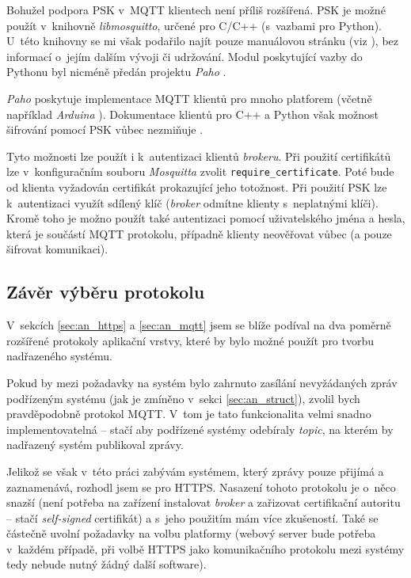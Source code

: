 Bohužel podpora PSK v~MQTT klientech není příliš rozšířená. PSK je možné použít v~knihovně \textit{libmosquitto}, určené pro C/C++ (s~vazbami pro Python). U~této knihovny se mi však podařilo najít pouze manuálovou stránku (viz \cite{libmosquitto_man}), bez informací o~jejím dalším vývoji či udržování. Modul poskytující vazby do Pythonu byl nicméně předán projektu \textit{Paho} \cite{mosquitto_python}.

\textit{Paho} poskytuje implementace MQTT klientů pro mnoho platforem (včetně například \textit{Arduina} \cite{paho_embedded}). Dokumentace klientů pro C++ a Python však možnost šifrování pomocí PSK vůbec nezmiňuje \cite{paho_cpp_doc} \cite{paho_pyt_doc}.

Tyto možnosti lze použít i k~autentizaci klientů \textit{brokeru}. Při použití certifikátů lze v~konfiguračním souboru \textit{Mosquitta} zvolit \verb|require_certificate|. Poté bude od klienta vyžadován certifikát prokazující jeho totožnost. Při použití PSK lze k~autentizaci využít sdílený klíč (\textit{broker} odmítne klienty s~neplatnými klíči). Kromě toho je možno použít také autentizaci pomocí uživatelského jména a hesla, která je součástí MQTT protokolu, případně klienty neověřovat vůbec (a pouze šifrovat komunikaci). \cite{mqtt_mosquitto_conf}

\subsection{Závěr výběru protokolu}

V~sekcích \ref{sec:an_https} a \ref{sec:an_mqtt} jsem se blíže podíval na dva poměrně rozšířené protokoly aplikační vrstvy, které by bylo možné použít pro tvorbu nadřazeného systému.

Pokud by mezi požadavky na systém bylo zahrnuto zasílání nevyžádaných zpráv podřízeným systému (jak je zmíněno v~sekci \ref{sec:an_struct}), zvolil bych pravděpodobně protokol MQTT. V~tom je tato funkcionalita velmi snadno implementovatelná -- stačí aby podřízené systémy odebíraly \textit{topic}, na kterém by nadřazený systém publikoval zprávy.

Jelikož se však v~této práci zabývám systémem, který zprávy pouze přijímá a zaznamenává, rozhodl jsem se pro HTTPS. Nasazení tohoto protokolu je o~něco snazší (není potřeba na zařízení instalovat \textit{broker} a zařizovat certifikační autoritu -- stačí \textit{self-signed} certifikát) a s~jeho použitím mám více zkušeností. Také se částečně uvolní požadavky na volbu platformy (webový server bude potřeba v~každém případě, při volbě HTTPS jako komunikačního protokolu mezi systémy tedy nebude nutný žádný další software). 

